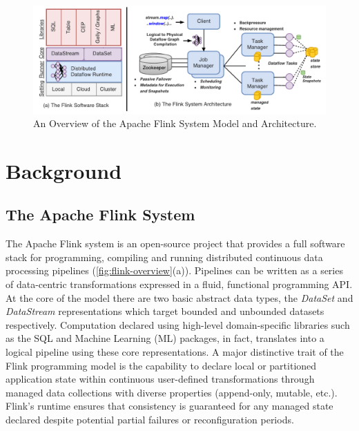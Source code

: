 
\begin{figure}[t!]
\centering
\includegraphics[width=\textwidth]{figures/flinkoverview.pdf}
\caption{An Overview of the Apache Flink System Model and Architecture.} 
\label{fig:flink-overview}
\vspace{-4mm}
\end{figure}

\section{Background}

\subsection{The Apache Flink System}

The Apache Flink system \cite{CUSTOM:web/Flink} is an open-source project that provides a full software stack for programming, compiling and running distributed continuous data processing pipelines (\autoref{fig:flink-overview}(a)). Pipelines can be written as a series of data-centric transformations expressed in a fluid, functional programming API. At the core of the model there are two basic abstract data types, the \emph{DataSet} and \emph{DataStream} representations which target bounded and unbounded datasets respectively. Computation declared using high-level domain-specific libraries such as the SQL and Machine Learning (ML) packages, in fact, translates into a logical pipeline using these core representations. A major distinctive trait of the Flink programming model is the capability to declare local or partitioned application state within continuous user-defined transformations through managed data collections with diverse properties (append-only, mutable, etc.). Flink's runtime ensures that consistency is guaranteed for any managed state declared despite potential partial failures or reconfiguration periods.

